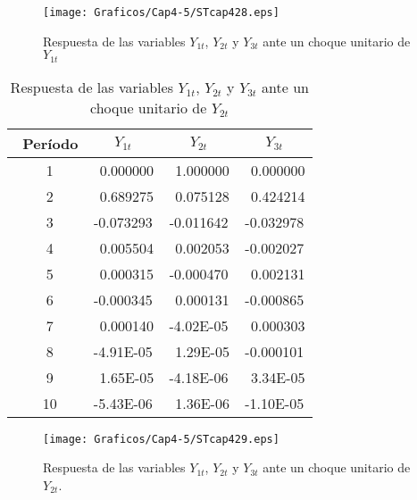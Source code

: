 \begin{figure}[H]
\centering
\texttt{[image: Graficos/Cap4-5/STcap428.eps]}
\caption{Respuesta de las variables $Y_{1t}$, $Y_{2t}$ y $Y_{3t}$ ante un choque unitario de $Y_{1t}$}
\label{fig28}
\end{figure}

\begin{table}[H]
\centering
\begin{tabular}{cccc}\hline\hline
~Per\'{i}odo & $Y_{1t}$ & $Y_{2t}$ & $Y_{3t}$\\ \hline\hline
~1 & ~0.000000 & ~1.000000 & ~0.000000 \\
~2 & ~0.689275 & ~0.075128 & ~0.424214 \\
~3 & -0.073293 & -0.011642 & -0.032978 \\
~4 & ~0.005504 & ~0.002053 & -0.002027 \\
~5 & ~0.000315 & -0.000470 & ~0.002131 \\
~6 & -0.000345 & ~0.000131 & -0.000865 \\
~7 & ~0.000140 & -4.02E-05 & ~0.000303 \\
~8 & -4.91E-05 & ~1.29E-05 & -0.000101 \\
~9 & ~1.65E-05 & -4.18E-06 & ~3.34E-05 \\
~10& -5.43E-06 & ~1.36E-06 & -1.10E-05 \\ \hline\hline
\end{tabular}
\caption{Respuesta de las variables $Y_{1t}$, $Y_{2t}$ y $Y_{3t}$ ante un choque unitario de $Y_{2t}$}
\label{tab25}
\end{table}


\begin{figure}[H]
\centering
\texttt{[image: Graficos/Cap4-5/STcap429.eps]}
\caption{Respuesta de las variables $Y_{1t}$, $Y_{2t}$ y $Y_{3t}$ ante un choque unitario de $Y_{2t}$.}
\label{fig29}
\end{figure}


